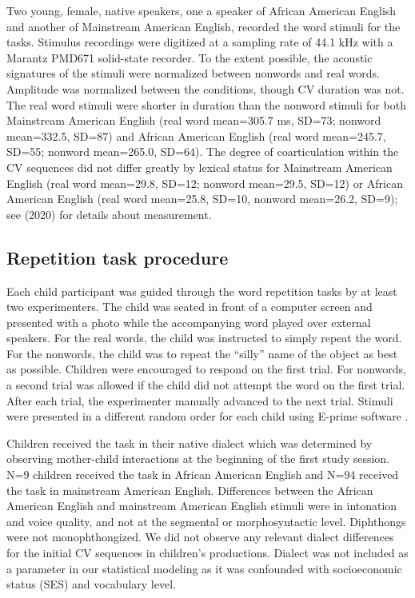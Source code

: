 \documentclass[a4paper,man,natbib,donotrepeattitle, apacite]{apa6}
\begin{document}
Two young, female, native speakers, one a speaker of African American English and another of Mainstream American English, recorded the word stimuli for the tasks. Stimulus recordings were digitized at a sampling rate of 44.1 kHz with a Marantz PMD671 solid-state recorder. To the extent possible, the acoustic signatures of the stimuli were normalized between nonwords and real words. Amplitude was normalized between the conditions, though CV duration was not. The real word stimuli were shorter in duration than the nonword stimuli for both Mainstream American English (real word mean=305.7 ms, SD=73; nonword mean=332.5, SD=87) and African American English (real word mean=245.7, SD=55; nonword mean=265.0, SD=64). The degree of coarticulation within the CV sequences did not differ greatly by lexical status for Mainstream American English (real word mean=29.8, SD=12; nonword mean=29.5, SD=12) or African American English (real word mean=25.8, SD=10, nonword mean=26.2, SD=9); see \citeauthor{cychoszLexicalAdvantageFouryearold2020} (2020) for details about measurement.   

\subsection{Repetition task procedure}

Each child participant was guided through the word repetition tasks by at least two experimenters. The child was seated in front of a computer screen and presented with a photo while the accompanying word played over external speakers. For the real words, the child was instructed to simply repeat the word. For the nonwords, the child was to repeat the ``silly'' name of the object as best as possible. Children were encouraged to respond on the first trial. For nonwords, a second trial was allowed if the child did not attempt the word on the first trial. After each trial, the experimenter manually advanced to the next trial. Stimuli were presented in a different random order for each child using E-prime software \cite{schneiderEPrime2012}. 

Children received the task in their native dialect which was determined by observing mother-child interactions at the beginning of the first study session. N=9 children received the task in African American English and N=94 received the task in mainstream American English. Differences between the African American English and mainstream American English stimuli were in intonation and voice quality, and not at the segmental or morphosyntactic level. Diphthongs were not monophthongized. We did not observe any relevant dialect differences for the initial CV sequences in children’s productions. Dialect was not included as a parameter in our statistical modeling as it was confounded with socioeconomic status (SES) and vocabulary level.
\end{document}

